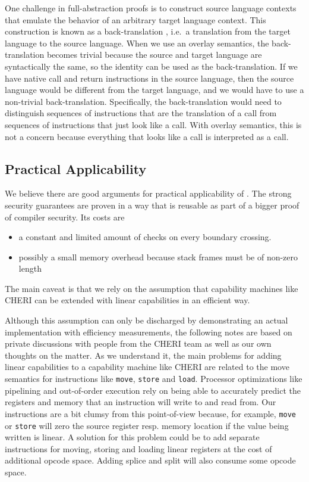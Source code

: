 \begin{jversion}
  One challenge in full-abstraction proofs is to construct source language contexts that emulate the behavior of an arbitrary target language context.
  This construction is known as a back-translation  \citep{devriese_modular_2017}, i.e.\ a translation from the target language to the source language.
  When we use an overlay semantics, the back-translation becomes trivial because the source and target language are syntactically the same, so the identity can be used as the back-translation.
  If we have native call and return instructions in the source language, then the source language would be different from the target language, and we would have to use a non-trivial back-translation.
  Specifically, the back-translation would need to distinguish sequences of instructions that are the translation of a call from sequences of instructions that just look like a call.
  With overlay semantics, this is not a concern because everything that looks like a call is interpreted as a call.
\end{jversion}

\subsection{Practical Applicability}
We believe there are good arguments for practical applicability of \stktokens{}.
The strong security guarantees are proven in a way that is reusable as part of a bigger proof of compiler security.
Its costs are
\begin{itemize}
\item a constant and limited amount of checks on every boundary crossing.
\item possibly a small memory overhead because stack frames must be of non-zero length
\end{itemize}
The main caveat is that we rely on the assumption that capability machines like CHERI can be extended with linear capabilities in an efficient way.

Although this assumption can only be discharged by demonstrating an actual implementation with efficiency measurements, the following notes are based on private discussions with people from the CHERI team as well as our own thoughts on the matter.
As we understand it, the main problems for adding linear capabilities to a capability machine like CHERI are related to the move semantics for instructions like \texttt{move}, \texttt{store} and \texttt{load}.
Processor optimizations like pipelining and out-of-order execution rely on being able to accurately predict the registers and memory that an instruction will write to and read from.
Our instructions are a bit clumsy from this point-of-view because, for example, \texttt{move} or \texttt{store} will zero the source register resp. memory location if the value being written is linear.
A solution for this problem could be to add separate instructions for moving, storing and loading linear registers at the cost of additional opcode space.
Adding splice and split will also consume some opcode space.

